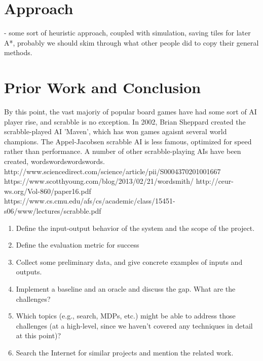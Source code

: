 \documentclass[12pt]{article}
\begin{document}
\section*{Approach}
- some sort of heuristic approach, coupled with simulation, saving tiles for later 
A*, probably we should skim through what other people did to copy their general methods.

\section*{Prior Work and Conclusion}

By this point, the vast majoriy of popular board games have had some sort of AI player rise, and scrabble is no exception. In 2002, Brian Sheppard created the scrabble-played AI 'Maven', which has won games agaisnt several world champions.  The Appel-Jacobsen scrabble AI is less famous, optimized for speed rather than performance.  A number of other scrabble-playing AIs have been created, wordswordswordswords. 
http://www.sciencedirect.com/science/article/pii/S0004370201001667
https://www.scotthyoung.com/blog/2013/02/21/wordsmith/
http://ceur-ws.org/Vol-860/paper16.pdf
https://www.cs.cmu.edu/afs/cs/academic/class/15451-s06/www/lectures/scrabble.pdf

\begin{enumerate}[label=(\roman*)]
  \item  Define the input-output behavior of the system and the scope of the project.
  \item  Define the evaluation metric for success
  \item  Collect some preliminary data, and give concrete examples of inputs and outputs.
  \item  Implement a baseline and an oracle and discuss the gap. What are the challenges?
  \item Which topics (e.g., search, MDPs, etc.) might be able to address those challenges (at a high-level, since we haven't covered any techniques in detail at this point)?
  \item  Search the Internet for similar projects and mention the related work.
\end{enumerate}
\end{document}
